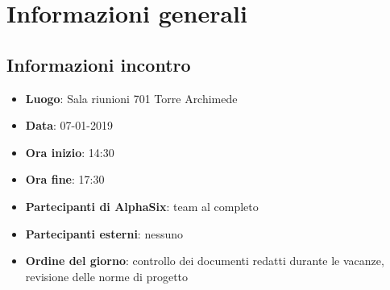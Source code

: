 \newcommand{\documento}{\VI}
\newcommand{\nomedocumentofisico}{VI\_07\_01\_2018.pdf}
\newcommand{\redazione}{\SG}
\newcommand{\verifica}{\MM}
\newcommand{\approvazione}{\NC}
\newcommand{\versione}{1.0.0}
\newcommand{\uso}{Interno}
\newcommand{\destinateTo}{\TV, \\ & \RC, \\ & \II}
\newcommand{\datacreazione}{08 gennaio 2019}
\newcommand{\datamodifica}{09 gennaio 2019}
\newcommand{\stato}{Approvato}

\def\TABELLE{false}	%
\def\FIGURE{false} 	%






    

    
    
	
    
    \section{Informazioni generali}
		\subsection{Informazioni incontro}
			\begin{itemize}
				\item { \textbf{Luogo}: Sala riunioni 701 Torre Archimede}
				\item { \textbf{Data}: 07-01-2019}
				\item { \textbf{Ora inizio}: 14:30}
				\item { \textbf{Ora fine}: 17:30}
				\item { \textbf{Partecipanti di AlphaSix}: team al completo}
				\item { \textbf{Partecipanti esterni}: nessuno}
				\item { \textbf{Ordine del giorno}: controllo dei documenti redatti durante le vacanze, revisione delle norme di progetto}
			\end{itemize}

